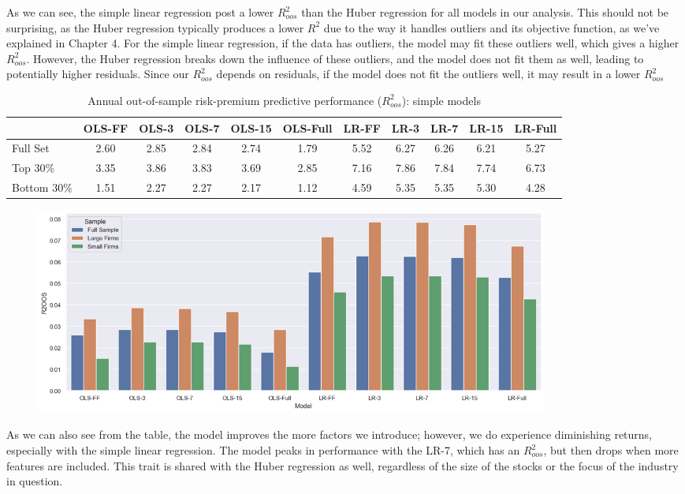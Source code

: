 As we can see, the simple linear regression post a lower $R^2_{oos}$ than the Huber regression for all models in our analysis. This should not be surprising, as the Huber regression typically produces a lower $R^2$ due to the way it handles outliers and its objective function, as we've explained in Chapter 4. For the simple linear regression, if the data has outliers, the model may fit these outliers well, which gives a higher $R^2_{oos}$. However, the Huber regression breaks down the influence of these outliers, and the model does not fit them as well, leading to potentially higher residuals. Since our $R^2_{oos}$ depends on residuals, if the model does not fit the outliers well, it may result in a lower $R^2_{oos}$

\begin{table}[ht]\label{tab:oos_simple}
	\centering
	\caption{Annual out-of-sample risk-premium predictive performance ($R^2_{oos}$): simple models}
	\begin{tabular}[t]{lcccccccccc}
		\toprule
		&OLS-FF&OLS-3&OLS-7&OLS-15&OLS-Full&LR-FF&LR-3&LR-7&LR-15&LR-Full\\
		\midrule
		Full Set&2.60&2.85&2.84&2.74&1.79&5.52&6.27&6.26&6.21&5.27\\	
		Top 30\%&3.35&3.86&3.83&3.69&2.85&7.16&7.86&7.84&7.74&6.73\\
		Bottom 30\%&1.51&2.27&2.27&2.17&1.12&4.59&5.35&5.35&5.30&4.28\\			   
		\bottomrule
	\end{tabular}\label{tab:prediction_sample}
\end{table}
\vspace{-7mm}
\begin{figure}[h]
	\centering
	\includegraphics[width=17cm]{content/images/r2_simple}
\end{figure}

As we can also see from the table, the model improves the more factors we introduce; however, we do experience diminishing returns, especially with the simple linear regression. The model peaks in performance with the LR-7, which has an $R^2_{oos}$, but then drops when more features are included. This trait is shared with the Huber regression as well, regardless of the size of the stocks or the focus of the industry in question.

